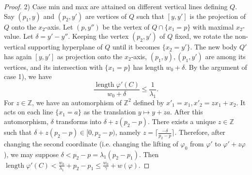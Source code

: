 \documentclass[10pt,a4paper]{amsart}
\newcommand{\Z}{{\mathbb Z}}
\newcommand{\length}{\operatorname{length}}
\begin{document}
\begin{proof}
	2) Case min and max are attained on different vertical lines defining $Q$. Say $(p_1,y)$ and $(p_2,y')$ are vertices of $Q$ such that $[y,y']$ is the projection of $Q$ onto the $x_2$-axis. Let $(p,y'')$ be the vertex of $Q\cap \{x_1=p\}$ with maximal $x_2$-value.	
	Let $\delta=y'-y''$. Keeping the vertex $(p_2,y')$ of $Q$ fixed, we rotate the non-vertical supporting hyperplane of $Q$ until it becomes $\{x_2=y'\}$. The new body $Q'$ has again $[y,y']$ as projection onto the $x_2$-axis, $(p_1,y),(p_1,y')$ are among its vertices, and its intersection with $\{x_1=p\}$ has length $w_0+\delta$. By the argument of case 1), we have 
	$$
	\frac{\length \varphi'(C)}{w_0+\delta}\le \frac{1}{\lambda_1}.
	$$ 	
	For $z\in \Z$, we have an automorphism of $\Z^2$ defined by $x'_1=x_1,x'_2=zx_1+x_2$. It acts on each line $\{x_1=a\}$ as the translation $y\mapsto y+za$.
	After this automorphism, $\delta$ transforms into $\delta+z(p_2-p)$.
	There exists a unique $z\in \Z$ such that $\delta+z(p_2-p)\in [0,p_2-p)$, namely 
	$z=\lceil \frac{-\delta}{p_2-p}\rceil$. Therefore, after changing the second coordinate
	(i.e. changing the lifting of $\varphi_0$ from $\varphi'$ to $\varphi'+z\varphi$), we may suppose $\delta<p_2-p=\lambda_1(p_2-p_1)$. Then
	$
	\length \varphi'(C) <\frac{w_0}{\lambda_1}+p_2-p_1\le \frac{w_0}{\gamma}+w(\varphi).
	$
\end{proof}
\end{document}
